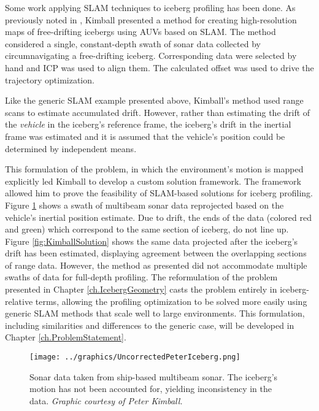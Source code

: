 Some work applying SLAM techniques to iceberg profiling has been done. As previously noted in \cite{Kimball2011b}, Kimball presented a method for creating high-resolution maps of free-drifting icebergs using AUVs based on SLAM. The method considered a single, constant-depth swath of sonar data collected by circumnavigating a free-drifting iceberg. Corresponding data were selected by hand and ICP was used to align them. The calculated offset was used to drive the trajectory optimization.

Like the generic SLAM example presented above, Kimball's method used range scans to estimate accumulated drift. However, rather than estimating the drift of the \emph{vehicle} in the iceberg's reference frame, the iceberg's drift in the inertial frame was estimated and it is assumed that the vehicle's position could be determined by independent means.  

This formulation of the problem, in which the environment's motion is mapped explicitly led Kimball to develop a custom solution framework. The framework allowed him to prove the feasibility of SLAM-based solutions for iceberg profiling. Figure \ref{fig:KimballPreSolution} shows a swath of multibeam sonar data reprojected based on the vehicle's inertial position estimate. Due to drift, the ends of the data (colored red and green) which correspond to the same section of iceberg, do not line up. Figure \ref{fig:KimballSolution} shows the same data projected after the iceberg's drift has been estimated, displaying agreement between the overlapping sections of range data. However, the method as presented did not accommodate multiple swaths of data for full-depth profiling. The reformulation of the problem presented in Chapter \ref{ch.IcebergGeometry} casts the problem entirely in iceberg-relative terms, allowing the profiling optimization to be solved more easily using generic SLAM methods that scale well to large environments. This formulation, including similarities and differences to the generic case, will be developed in Chapter \ref{ch.ProblemStatement}.

 \begin{figure}[!htb]
   \centering
   \texttt{[image: ../graphics/UncorrectedPeterIceberg.png]} %
   \caption{Sonar data taken from ship-based multibeam sonar. The iceberg's motion has not been accounted for, yielding inconsistency in the data. \emph{Graphic courtesy of Peter Kimball.}}
   \label{fig:KimballPreSolution}
\end{figure}

